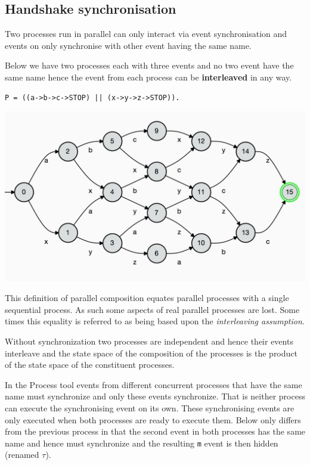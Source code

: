 \documentclass[]{article}
\begin{document}
\subsection{Handshake synchronisation }

Two processes run in parallel can only interact via event synchronisation and events on only synchronise with other event having the same name.

Below we have two processes each with three events and no two event have the same name hence the event from each process can be {\bf interleaved} in any way.

 \begin{center} 
\begin{minipage}{0.4\textwidth}
\begin{verbatim}
P = ((a->b->c->STOP) || (x->y->z->STOP)).
\end{verbatim} 
\end{minipage}
\includegraphics[scale=0.2]{par.jpg}
\end{center}
This definition of parallel composition equates parallel processes with a single sequential process. As such some aspects  of real parallel processes are lost. Some times this  equality is referred to as being based upon the \emph{interleaving assumption}.



Without synchronization  two processes   are independent and hence their events interleave and the state space of the composition of the processes is the product of the state space of the constituent processes. 
 

   In the Process tool events from different concurrent processes that have the same name must synchronize and only these events synchronize. That is neither process can  execute the synchronising event on its own.  These  synchronising events are only executed when both processes are ready to execute them. 
  Below only differs  from the previous process in that the second event in both processes has the same name and hence must  synchronize and the resulting \verb$m$ event is then hidden (renamed $\tau$).
  
\end{document}
